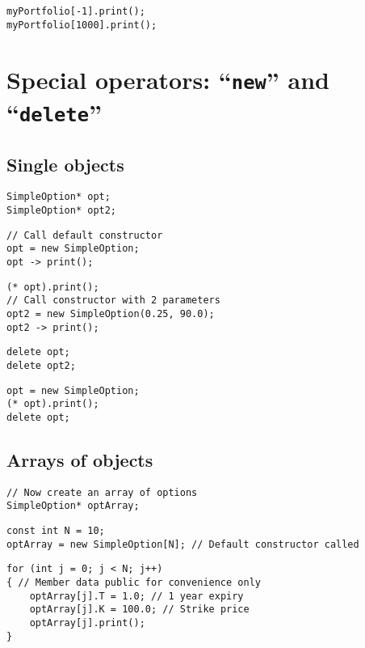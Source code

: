 \begin{lstlisting}
myPortfolio[-1].print();
myPortfolio[1000].print();
\end{lstlisting}

\section{Special operators: ``\texttt{new}'' and ``\texttt{delete}''}

\subsection{Single objects}

\begin{lstlisting}
SimpleOption* opt;
SimpleOption* opt2;
\end{lstlisting}

\begin{lstlisting}
// Call default constructor
opt = new SimpleOption;
opt -> print();
\end{lstlisting}

\begin{lstlisting}
(* opt).print();
// Call constructor with 2 parameters
opt2 = new SimpleOption(0.25, 90.0);
opt2 -> print();
\end{lstlisting}

\begin{lstlisting}
delete opt;
delete opt2;
\end{lstlisting}

\begin{lstlisting}
opt = new SimpleOption;
(* opt).print();
delete opt;
\end{lstlisting}

\subsection{Arrays of objects}

\begin{lstlisting}
// Now create an array of options
SimpleOption* optArray;
\end{lstlisting}

\begin{lstlisting}
const int N = 10;
optArray = new SimpleOption[N]; // Default constructor called
\end{lstlisting}

\begin{lstlisting}
for (int j = 0; j < N; j++)
{ // Member data public for convenience only
	optArray[j].T = 1.0; // 1 year expiry
	optArray[j].K = 100.0; // Strike price
	optArray[j].print();
}
\end{lstlisting}

